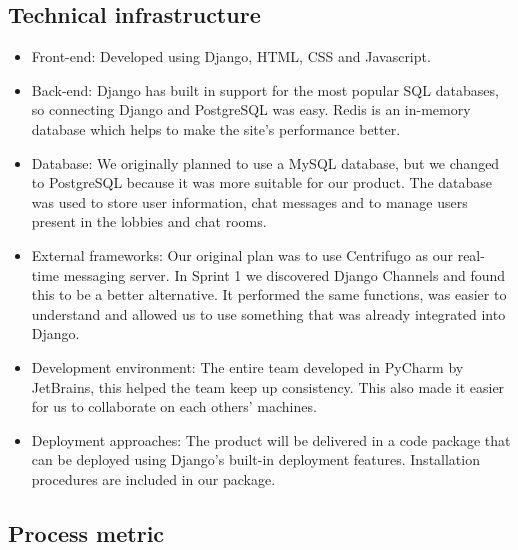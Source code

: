 \subsection{Technical infrastructure}
\begin{itemize}
    \item Front-end: Developed using Django, HTML, CSS and Javascript.
    \item Back-end: Django has built in support for the most popular SQL databases, so connecting Django and PostgreSQL was easy. Redis is an in-memory database which helps to make the site's performance better.
    \item Database: We originally planned to use a MySQL database, but we changed to PostgreSQL because it was more suitable for our product. The database was used to store user information, chat messages and to manage users present in the lobbies and chat rooms. 
    \item External frameworks: Our original plan was to use Centrifugo as our real-time messaging server. In Sprint 1 we discovered Django Channels and found this to be a better alternative. It performed the same functions, was easier to understand and allowed us to use something that was already integrated into Django.
    \item Development environment: The entire team developed in PyCharm by JetBrains, this helped the team keep up consistency. This also made it easier for us to collaborate on each others' machines.
    \item  Deployment approaches: The product will be delivered in a code package that can be deployed using Django's built-in deployment features. Installation procedures are included in our package.
\end{itemize}

\newpage
\subsection{Process metric}
